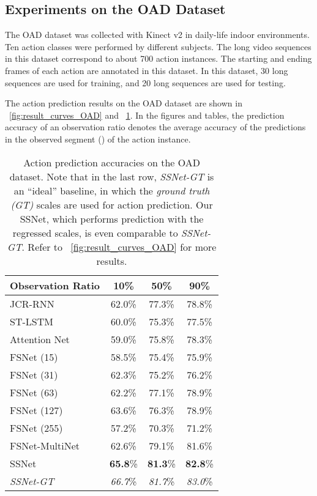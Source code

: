 \documentclass[10pt,twocolumn,letterpaper]{article}
\begin{document}
\subsection{Experiments on the OAD Dataset}



The OAD dataset \cite{li2016online} was collected with Kinect v2 in daily-life indoor environments.
Ten action classes were performed by different subjects.
The long video sequences in this dataset correspond to about 700 action instances. The starting and ending frames of each action are annotated in this dataset.
In this dataset,
30 long sequences are used for training, and 20 long sequences are used for testing.



The action prediction results on the OAD dataset are shown in \figurename{~\ref{fig:result_curves_OAD}} and \tablename{~\ref{table:resultOAD}}.
In the figures and tables,
the prediction accuracy of an observation ratio  denotes the average accuracy of the
predictions in the observed segment () of the action instance.  


\begin{table}[htbp]
	\caption{Action prediction accuracies on the OAD dataset.
        Note that in the last row, \emph{SSNet-GT} is an ``ideal'' baseline,
		in which the \emph{ground truth (GT)} scales are used for action prediction.
		Our SSNet, which performs prediction with the regressed scales, is even comparable to \emph{SSNet-GT}.
        Refer to \figurename{~\ref{fig:result_curves_OAD}} for more results.
	}
	\label{table:resultOAD}
	\centering
    \small
	\begin{tabular}{lccc}
    \toprule
    Observation Ratio                    & 10\% & 50\% & 90\% \\
    \midrule JCR-RNN                              & 62.0\% & 77.3\% & 78.8\% \\
    ST-LSTM                              & 60.0\% & 75.3\% & 77.5\% \\
    Attention Net                        & 59.0\% & 75.8\% & 78.3\% \\
    \midrule
    FSNet (15)                           & 58.5\% & 75.4\% & 75.9\% \\
    FSNet (31)                           & 62.3\% & 75.2\% & 76.2\% \\
    FSNet (63)                           & 62.2\% & 77.1\% & 78.9\% \\
    FSNet (127)                          & 63.6\% & 76.3\% & 78.9\% \\
    FSNet (255)                          & 57.2\% & 70.3\% & 71.2\% \\
    FSNet-MultiNet                       & 62.6\% & 79.1\% & 81.6\% \\
    \midrule
    SSNet                                & \textbf{65.8}\%& \textbf{81.3}\% & \textbf{82.8}\% \\
    \midrule
    \emph{SSNet-GT}                      & \emph{66.7}\% & \emph{81.7}\% & \emph{83.0}\% \\
    \bottomrule
	\end{tabular}
\end{table}
\end{document}
